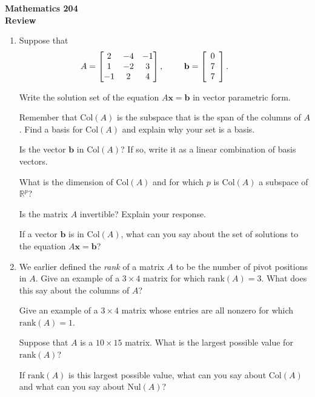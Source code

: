 \documentclass[12pt]{article}
\newcommand{\vs}[1]{\vspace{#1in}}
\newcommand{\bvec}{{\mathbf b}}
\newcommand{\xvec}{{\mathbf x}}
\newcommand{\real}{{\mathbb R}}
\newcommand{\threevec}[3]{\left[\begin{array}{r}#1 \\ #2 \\ #3
  \end{array}\right]}
\newcommand{\rank}{\text{rank}}
\newcommand{\col}{\text{Col}}
\newcommand{\nul}{\text{Nul}}
\begin{document}
\noindent
{\bf Mathematics 204} \\ 
{\bf Review}

\bigskip
\begin{enumerate}
\item Suppose that
  $$A = \begin{bmatrix}
    2 & -4 & -1 \\
    1 & -2 & 3 \\
    -1 & 2 & 4 \\
  \end{bmatrix},
  \hspace*{24pt}
  \bvec=\threevec077. \hspace*{24pt}
  $$
  
  Write the solution set of the equation $A\xvec = \bvec$ in vector
  parametric form.

  \vs{1.5}
  Remember that $\col(A)$ is the subspace that is the span of the
  columns of $A$.  Find a basis for $\col(A)$ and explain why your set
  is a basis.

  \vs{1}
  Is the vector $\bvec$ in $\col(A)$?  If so, write it as a linear
  combination of basis vectors.

  \vs{1.2}
  What is the dimension of $\col(A)$ and for which $p$ is
  $\col(A)$ a subspace of $\real^p$?

  \vs{1.2}
  Is the matrix $A$ invertible?  Explain your response.

  \vs{1}
  \newpage
  If a vector $\bvec$ is in $\col(A)$, what can you say about the set
  of solutions to the equation $A\xvec = \bvec$?

  \vs{1}
  
\item We earlier defined the {\em rank} of a matrix $A$ to be the
  number of pivot positions in $A$.  
  Give an example of a $3\times 4$ matrix for which $\rank(A) = 3$.
  What does this say about the columns of $A$? 

  \vs{1}

  Give an example of a $3\times 4$ matrix whose entries are all
  nonzero for which $\rank(A)=1$.

  \vs{1}

  Suppose that $A$ is a $10\times15$ matrix.  What is the largest
  possible value for $\rank(A)$?

  \vs{1}
  If $\rank(A)$ is this largest possible value, what can you say about
  $\col(A)$ and what can you say about $\nul(A)$?


\end{enumerate}
\end{document}
